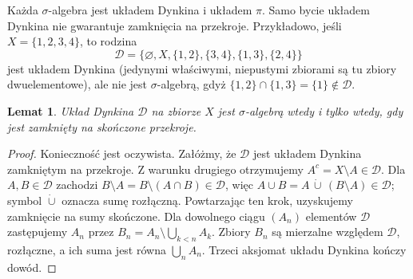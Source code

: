 \documentclass[11pt,a4paper,oneside]{book}
\numberwithin{equation}{chapter}
\theoremstyle{plain}
\newtheorem{lemat}[twierdzenie]{Lemat}
\theoremstyle{definition}
\theoremstyle{remark}
\begin{document}
Każda $\sigma$-algebra jest układem Dynkina i układem $\pi$.
Samo bycie układem Dynkina nie gwarantuje zamknięcia na przekroje.
Przykładowo, jeśli $X=\{1,2,3,4\}$, to rodzina
\[
\mathcal D=\{\varnothing,X,\{1,2\},\{3,4\},\{1,3\},\{2,4\}\}
\]
jest układem Dynkina (jedynymi właściwymi, niepustymi zbiorami są tu
zbiory dwuelementowe), ale nie jest $\sigma$-algebrą, gdyż
$\{1,2\}\cap\{1,3\}=\{1\}\notin\mathcal D$.

\begin{lemat}
\label{lem:dynkin-intersection}
Układ Dynkina $\mathcal D$ na zbiorze $X$ jest $\sigma$-algebrą wtedy
i tylko wtedy, gdy jest zamknięty na skończone przekroje.
\end{lemat}
\begin{proof}
Konieczność jest oczywista. Załóżmy, że $\mathcal D$ jest układem
Dynkina zamkniętym na przekroje. Z warunku drugiego otrzymujemy
$A^c=X\setminus A\in\mathcal D$. Dla $A,B\in\mathcal D$ zachodzi
$B\setminus A=B\setminus(A\cap B)\in\mathcal D$, więc
$A\cup B=A\,\dot\cup\,(B\setminus A)\in\mathcal D$; symbol
$\dot\cup$ oznacza sumę rozłączną. Powtarzając ten krok, uzyskujemy
zamknięcie na sumy skończone. Dla dowolnego ciągu $(A_n)$ elementów
$\mathcal D$ zastępujemy $A_n$ przez
$B_n=A_n\setminus\bigcup_{k<n}A_k$. Zbiory $B_n$ są mierzalne względem
$\mathcal D$, rozłączne, a ich suma jest równa $\bigcup_nA_n$.
Trzeci aksjomat układu Dynkina kończy dowód.
\end{proof}
\end{document}

